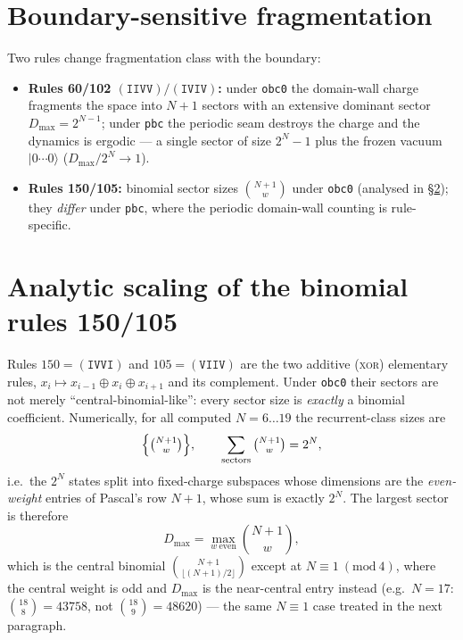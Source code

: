 \documentclass[11pt]{article}
\newcommand{\rt}[1]{\texttt{#1}}
\begin{document}
\section{Boundary-sensitive fragmentation}
Two rules change fragmentation class with the boundary:
\begin{itemize}
  \item \textbf{Rules 60/102 $(\rt{IIVV})/(\rt{IVIV})$:} under \rt{obc0} the
  domain-wall charge fragments the space into $N+1$ sectors with an extensive
  dominant sector $D_{\max}=2^{N-1}$; under \rt{pbc} the periodic seam destroys
  the charge and the dynamics is ergodic --- a single sector of size $2^N-1$ plus
  the frozen vacuum $|0\cdots0\rangle$ ($D_{\max}/2^N\to1$).
  \item \textbf{Rules 150/105:} binomial sector sizes $\binom{N+1}{w}$ under
  \rt{obc0} (analysed in \S\ref{sec:binomial}); they \emph{differ} under \rt{pbc},
  where the periodic domain-wall counting is rule-specific.
\end{itemize}

\section{Analytic scaling of the binomial rules 150/105}
\label{sec:binomial}
Rules $150=(\rt{IVVI})$ and $105=(\rt{VIIV})$ are the two additive (\textsc{xor})
elementary rules, $x_i\mapsto x_{i-1}\oplus x_i\oplus x_{i+1}$ and its complement. Under
\rt{obc0} their sectors are not merely ``central-binomial-like'': every sector
size is \emph{exactly} a binomial coefficient. Numerically, for all computed
$N=6\ldots19$ the recurrent-class sizes are
\begin{equation}
  \Big\{\tbinom{N+1}{w}\Big\},\qquad
  \sum_{\text{sectors}}\tbinom{N+1}{w}=2^{N},
  \label{eq:binom-sectors}
\end{equation}
i.e.\ the $2^N$ states split into fixed-charge subspaces whose dimensions are the
\emph{even-weight} entries of Pascal's row $N+1$, whose sum is exactly $2^N$.
The largest sector is therefore
\begin{equation}
  D_{\max}=\max_{w\ \mathrm{even}}\binom{N+1}{w},
  \label{eq:dmax-central}
\end{equation}
which is the central binomial $\binom{N+1}{\lfloor(N+1)/2\rfloor}$ except at
$N\equiv1\ (\mathrm{mod}\ 4)$, where the central weight is odd and $D_{\max}$ is
the near-central entry instead (e.g.\ $N=17$: $\binom{18}{8}=43758$, not
$\binom{18}{9}=48620$) --- the same $N\equiv1$ case treated in the next
paragraph.
\end{document}
